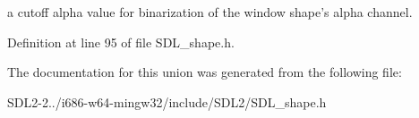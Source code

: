 a cutoff alpha value for binarization of the window shape's alpha channel. 



Definition at line 95 of file S\+D\+L\+\_\+shape.\+h.



The documentation for this union was generated from the following file\+:\begin{DoxyCompactItemize}
\item 
S\+D\+L2-\/2../i686-\/w64-\/mingw32/include/\+S\+D\+L2/S\+D\+L\+\_\+shape.\+h\end{DoxyCompactItemize}
